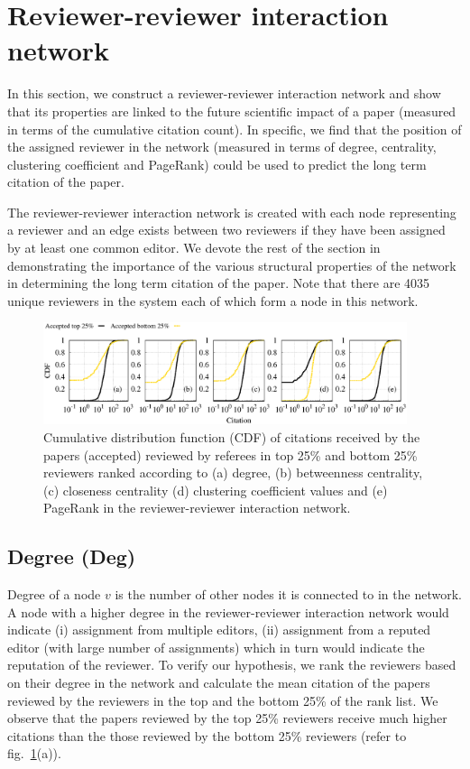 \section{Reviewer-reviewer interaction network}
\label{rev_int_net}
In this section, we construct a reviewer-reviewer interaction network and show that its properties are linked to the future scientific impact of a paper (measured in terms of the cumulative citation count). In specific, we find that the position of the assigned reviewer in the network (measured in terms of degree, centrality, clustering coefficient and PageRank) could be used to predict the long term citation of the paper. 
 
The reviewer-reviewer interaction network is created with each node representing a reviewer and an edge exists between two reviewers if they have been assigned by at least one common editor. We devote the rest of the section in demonstrating the importance of the various structural properties of the network in determining the long term citation of the paper. Note that there are 4035 unique reviewers in the system each of which form a node in this network.

\begin{figure}
\centering
\includegraphics[width = 0.95\textwidth]{./texfiles/Chapter_4/jcdl/figures/citation_.eps} 
\caption{\label{fig:net_citation} Cumulative distribution function (CDF) of citations received by the papers (accepted) reviewed by referees in top 25\% and bottom 25\% reviewers ranked according to (a) degree, (b) betweenness centrality, (c) closeness centrality (d) clustering coefficient values and (e) PageRank in the reviewer-reviewer interaction network.}
\end{figure}

\subsection{Degree (Deg)}
Degree of a node $v$ is the number of other nodes it is connected to in the network. A node with a higher degree in the reviewer-reviewer interaction network would indicate (i) assignment from multiple editors, (ii) assignment from a reputed editor (with large number of assignments) which in turn would indicate the reputation of the reviewer. To verify our hypothesis, we rank the reviewers based on their degree in the network and calculate the mean citation of the papers reviewed by the reviewers in the top and the bottom 25\% of the rank list. We observe that  the papers reviewed by the top 25\% reviewers receive much higher citations than the those reviewed by the bottom 25\% reviewers (refer to fig.~\ref{fig:net_citation}(a)).    

